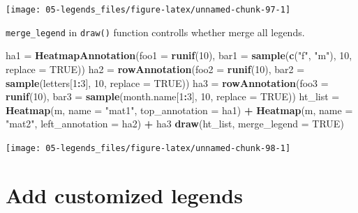 \documentclass[]{book}
\newenvironment{Shaded}{\begin{snugshade}}{\end{snugshade}}
\newcommand{\KeywordTok}[1]{\textcolor[rgb]{0.13,0.29,0.53}{\textbf{#1}}}
\newcommand{\DataTypeTok}[1]{\textcolor[rgb]{0.13,0.29,0.53}{#1}}
\newcommand{\DecValTok}[1]{\textcolor[rgb]{0.00,0.00,0.81}{#1}}
\newcommand{\StringTok}[1]{\textcolor[rgb]{0.31,0.60,0.02}{#1}}
\newcommand{\OtherTok}[1]{\textcolor[rgb]{0.56,0.35,0.01}{#1}}
\newcommand{\OperatorTok}[1]{\textcolor[rgb]{0.81,0.36,0.00}{\textbf{#1}}}
\newcommand{\NormalTok}[1]{#1}
\theoremstyle{definition}
\theoremstyle{definition}
\theoremstyle{definition}
\theoremstyle{remark}
\begin{document}
\begin{center}\texttt{[image: 05-legends\_files/figure-latex/unnamed-chunk-97-1]} \end{center}

\texttt{merge\_legend} in \texttt{draw()} function controlls whether
merge all legends.

\begin{Shaded}
\begin{Highlighting}[]
\NormalTok{ha1 =}\StringTok{ }\KeywordTok{HeatmapAnnotation}\NormalTok{(}\DataTypeTok{foo1 =} \KeywordTok{runif}\NormalTok{(}\DecValTok{10}\NormalTok{), }
    \DataTypeTok{bar1 =} \KeywordTok{sample}\NormalTok{(}\KeywordTok{c}\NormalTok{(}\StringTok{"f"}\NormalTok{, }\StringTok{"m"}\NormalTok{), }\DecValTok{10}\NormalTok{, }\DataTypeTok{replace =} \OtherTok{TRUE}\NormalTok{))}
\NormalTok{ha2 =}\StringTok{ }\KeywordTok{rowAnnotation}\NormalTok{(}\DataTypeTok{foo2 =} \KeywordTok{runif}\NormalTok{(}\DecValTok{10}\NormalTok{), }
    \DataTypeTok{bar2 =} \KeywordTok{sample}\NormalTok{(letters[}\DecValTok{1}\OperatorTok{:}\DecValTok{3}\NormalTok{], }\DecValTok{10}\NormalTok{, }\DataTypeTok{replace =} \OtherTok{TRUE}\NormalTok{))}
\NormalTok{ha3 =}\StringTok{ }\KeywordTok{rowAnnotation}\NormalTok{(}\DataTypeTok{foo3 =} \KeywordTok{runif}\NormalTok{(}\DecValTok{10}\NormalTok{), }
    \DataTypeTok{bar3 =} \KeywordTok{sample}\NormalTok{(month.name[}\DecValTok{1}\OperatorTok{:}\DecValTok{3}\NormalTok{], }\DecValTok{10}\NormalTok{, }\DataTypeTok{replace =} \OtherTok{TRUE}\NormalTok{))}
\NormalTok{ht_list =}\StringTok{ }\KeywordTok{Heatmap}\NormalTok{(m, }\DataTypeTok{name =} \StringTok{"mat1"}\NormalTok{, }\DataTypeTok{top_annotation =}\NormalTok{ ha1) }\OperatorTok{+}\StringTok{ }
\StringTok{    }\KeywordTok{Heatmap}\NormalTok{(m, }\DataTypeTok{name =} \StringTok{"mat2"}\NormalTok{, }\DataTypeTok{left_annotation =}\NormalTok{ ha2) }\OperatorTok{+}\StringTok{ }
\StringTok{    }\NormalTok{ha3}
\KeywordTok{draw}\NormalTok{(ht_list, }\DataTypeTok{merge_legend =} \OtherTok{TRUE}\NormalTok{)}
\end{Highlighting}
\end{Shaded}

\begin{center}\texttt{[image: 05-legends\_files/figure-latex/unnamed-chunk-98-1]} \end{center}

\section{Add customized legends}\label{add-customized-legends}
\end{document}
